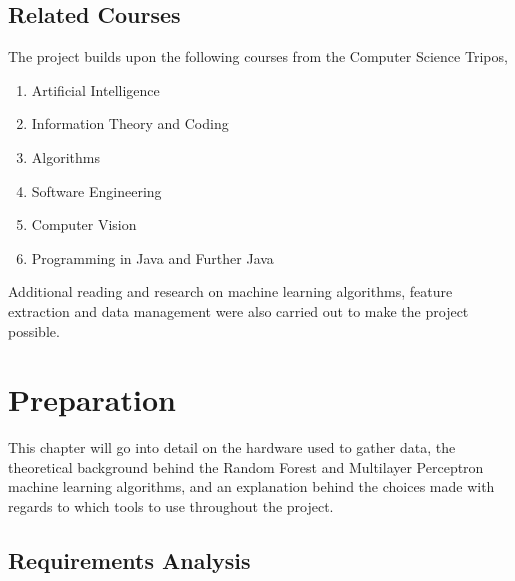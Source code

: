 \documentclass[a4paper,12pt,twoside]{report}
\begin{document}
\section{Related Courses}
The project builds upon the following courses from the Computer Science Tripos,
\begin{enumerate}
	\item Artificial Intelligence 
	\item Information Theory and Coding
	\item Algorithms
	\item Software Engineering
	\item Computer Vision
	\item Programming in Java and Further Java
\end{enumerate}

Additional reading and research on machine learning algorithms, feature extraction and data management were also carried out to make the project possible.
\chapter{Preparation}

This chapter will go into detail on the hardware used to gather data, the theoretical background behind the Random Forest and Multilayer Perceptron machine learning algorithms, and an explanation behind the choices made with regards to which tools to use throughout the project.

\section{Requirements Analysis}

\renewcommand\H{\multicolumn{1}{>{\columncolor{red!30}[9pt]}c}{H}}
\newcommand\M{\multicolumn{1}{>{\columncolor{yellow!30}[9pt]}c}{M}}
\renewcommand\L{\multicolumn{1}{>{\columncolor{green!30}[9pt]}c}{L}}
\end{document}
